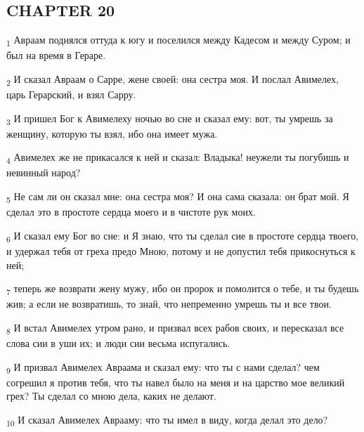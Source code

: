 \subsection{CHAPTER 20}
\begin{tcolorbox}
\textsubscript{1} Авраам поднялся оттуда к югу и поселился между Кадесом и между Суром; и был на время в Гераре.
\end{tcolorbox}
\begin{tcolorbox}
\textsubscript{2} И сказал Авраам о Сарре, жене своей: она сестра моя. И послал Авимелех, царь Герарский, и взял Сарру.
\end{tcolorbox}
\begin{tcolorbox}
\textsubscript{3} И пришел Бог к Авимелеху ночью во сне и сказал ему: вот, ты умрешь за женщину, которую ты взял, ибо она имеет мужа.
\end{tcolorbox}
\begin{tcolorbox}
\textsubscript{4} Авимелех же не прикасался к ней и сказал: Владыка! неужели ты погубишь и невинный народ?
\end{tcolorbox}
\begin{tcolorbox}
\textsubscript{5} Не сам ли он сказал мне: она сестра моя? И она сама сказала: он брат мой. Я сделал это в простоте сердца моего и в чистоте рук моих.
\end{tcolorbox}
\begin{tcolorbox}
\textsubscript{6} И сказал ему Бог во сне: и Я знаю, что ты сделал сие в простоте сердца твоего, и удержал тебя от греха предо Мною, потому и не допустил тебя прикоснуться к ней;
\end{tcolorbox}
\begin{tcolorbox}
\textsubscript{7} теперь же возврати жену мужу, ибо он пророк и помолится о тебе, и ты будешь жив; а если не возвратишь, то знай, что непременно умрешь ты и все твои.
\end{tcolorbox}
\begin{tcolorbox}
\textsubscript{8} И встал Авимелех утром рано, и призвал всех рабов своих, и пересказал все слова сии в уши их; и люди сии весьма испугались.
\end{tcolorbox}
\begin{tcolorbox}
\textsubscript{9} И призвал Авимелех Авраама и сказал ему: что ты с нами сделал? чем согрешил я против тебя, что ты навел было на меня и на царство мое великий грех? Ты сделал со мною дела, каких не делают.
\end{tcolorbox}
\begin{tcolorbox}
\textsubscript{10} И сказал Авимелех Аврааму: что ты имел в виду, когда делал это дело?
\end{tcolorbox}
